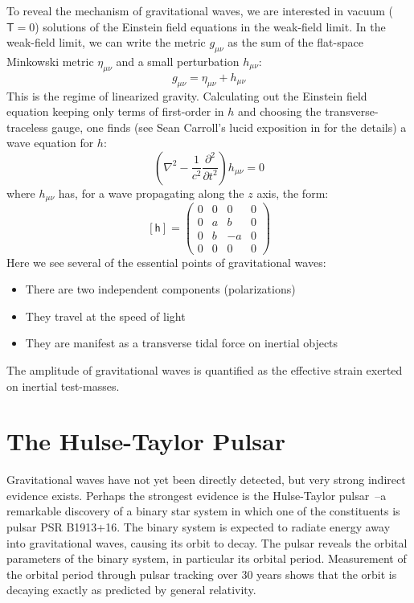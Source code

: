 To reveal the mechanism of gravitational waves, we are interested in
vacuum ($\mathsf{T}=0$) solutions of the Einstein field equations in
the weak-field limit.  In the weak-field limit, we can write the
metric $g_{\mu\nu}$ as the sum of the flat-space Minkowski metric
$\eta_{\mu\nu}$ and a small perturbation $h_{\mu\nu}$:
$$g_{\mu\nu} = \eta_{\mu\nu} + h_{\mu\nu}$$ This is the regime of
linearized gravity.  Calculating out the Einstein field equation
keeping only terms of first-order in $h$ and choosing the
transverse-traceless gauge, one finds (see Sean Carroll's lucid
exposition in \cite{Carroll1997Lecture} for the details) a wave
equation for $h$:
$$\left(\nabla^2 - \frac{1}{c^2}\frac{\partial^2}{\partial t^2}\right)h_{\mu\nu} = 0$$
where $h_{\mu\nu}$ has, for a wave propagating along the $z$ axis, the form:
$$ [\mathsf{h}] = \left(
\begin{array}{cccc}
0 & 0 &  0 & 0 \\
0 & a &  b & 0 \\
0 & b & -a & 0 \\ 
0 & 0 &  0 & 0 
\end{array}
 \right)$$
Here we see several of the essential points of gravitational waves:
\begin{itemize}
\item There are two independent components (polarizations)
\item They travel at the speed of light 
\item They are manifest as a transverse tidal force on inertial objects
\end{itemize}

The amplitude of gravitational waves is quantified as the effective
strain exerted on inertial test-masses.

\section{The Hulse-Taylor Pulsar}

Gravitational waves have not yet been directly detected, but very
strong indirect evidence exists.  Perhaps the strongest evidence is
the Hulse-Taylor
pulsar~\cite{Hulse1975Discovery,Weisberg2005Relativistic}--a
remarkable discovery of a binary star system in which one of the
constituents is pulsar PSR B1913+16. The binary system is expected to
radiate energy away into gravitational waves, causing its orbit to
decay.  The pulsar reveals the orbital parameters of the binary
system, in particular its orbital period. Measurement of the orbital
period through pulsar tracking over 30 years shows that the orbit is
decaying exactly as predicted by general relativity.

